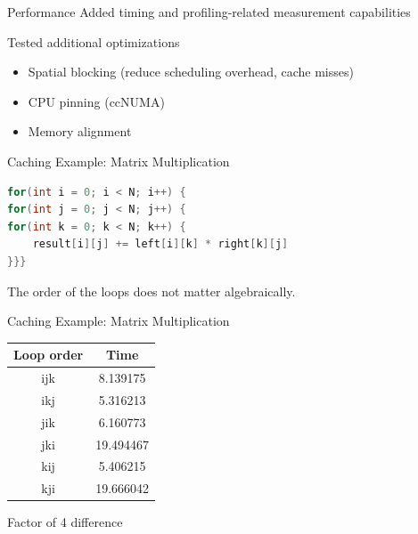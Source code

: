 \documentclass{beamer}
\begin{document}
    \begin{frame}{Performance}
        Added timing and profiling-related measurement capabilities

        \vfill

        Tested additional optimizations
        \begin{itemize}
            \item Spatial blocking (reduce scheduling overhead, cache misses)
            \item CPU pinning (ccNUMA)
            \item Memory alignment
        \end{itemize}
    \end{frame}

    \begin{frame}[fragile=singleslide]{Caching Example: Matrix Multiplication}
        \begin{lstlisting}[language=C]
for(int i = 0; i < N; i++) {
for(int j = 0; j < N; j++) {
for(int k = 0; k < N; k++) {
    result[i][j] += left[i][k] * right[k][j]
}}}
        \end{lstlisting}

        \vfill

        The order of the loops does not matter algebraically.
    \end{frame}

    \begin{frame}{Caching Example: Matrix Multiplication}
        \begin{center}
            \begin{tabular}{cc}
                \toprule
                Loop order & Time \\
                \midrule
                ijk & 8.139175 \\
                ikj & 5.316213 \\
                jik & 6.160773 \\
                jki & 19.494467 \\
                kij & 5.406215 \\
                kji & 19.666042 \\
                \bottomrule
            \end{tabular}
        \end{center}

        \vfill

        \alert{Factor of 4 difference}
    \end{frame}
\end{document}
